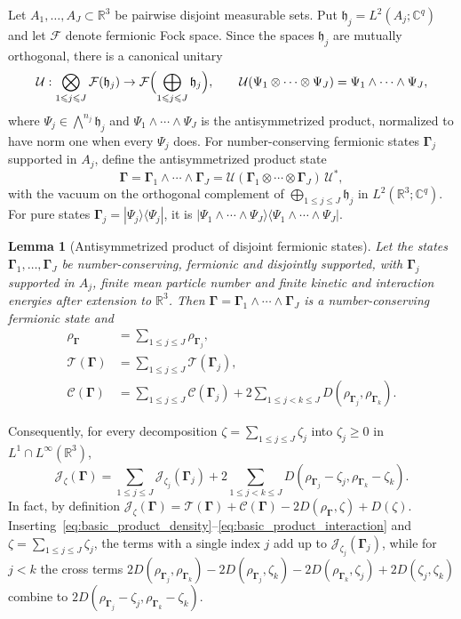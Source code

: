 \documentclass[final,reqno]{amsart}
\newtheorem{lemma}[theorem]{Lemma}
\theoremstyle{remark}
\theoremstyle{definition}
\renewcommand{\le}{\leqslant}
\renewcommand{\ge}{\geqslant}
\newcommand{\RR}{\mathbb{R}}
\newcommand{\CC}{\mathbb{C}}
\newcommand{\TC}{\mathcal{T}}
\newcommand{\Cc}{\mathcal{C}}
\newcommand{\Fock}{\mathcal{F}}
\newcommand{\vGamma}{{\bm{\Gamma}}}
\begin{document}
Let $A_1,\ldots,A_J\subset\RR^3$ be pairwise disjoint measurable sets. Put $\mathfrak h_j=L^2(A_j;\CC^q)$ and let $\Fock$ denote fermionic Fock space. Since the spaces $\mathfrak h_j$ are mutually orthogonal, there is a canonical unitary
\[
\mathcal U:\bigotimes_{1\le j\le J}\Fock(\mathfrak h_j)\to\Fock\Bigl(\bigoplus_{1\le j\le J}\mathfrak h_j\Bigr),
\qquad
\mathcal U(\Psi_1\otimes\cdots\otimes\Psi_J)=\Psi_1\wedge\cdots\wedge\Psi_J,
\]
where $\Psi_j\in\bigwedge^{n_j}\mathfrak h_j$ and $\Psi_1\wedge\cdots\wedge\Psi_J$ is the antisymmetrized product, normalized to have norm one when every $\Psi_j$ does. For number-conserving fermionic states $\vGamma_j$ supported in $A_j$, define the antisymmetrized product state
\[
\vGamma=\vGamma_1\wedge\cdots\wedge\vGamma_J=\mathcal U(\vGamma_1\otimes\cdots\otimes\vGamma_J)\,\mathcal U^*,
\]
with the vacuum on the orthogonal complement of $\bigoplus_{1\le j\le J}\mathfrak h_j$ in $L^2(\RR^3;\CC^q)$. For pure states $\vGamma_j=|\Psi_j\rangle\langle\Psi_j|$, it is $|\Psi_1\wedge\cdots\wedge\Psi_J\rangle\langle\Psi_1\wedge\cdots\wedge\Psi_J|$.

\begin{lemma}[Antisymmetrized product of disjoint fermionic states]\label{lem:basic_product}
Let the states $\vGamma_1,\ldots,\vGamma_J$ be number-conserving, fermionic and disjointly supported, with $\vGamma_j$ supported in $A_j$, finite mean particle number and finite kinetic and interaction energies after extension to $\RR^3$. Then $\vGamma=\vGamma_1\wedge\cdots\wedge\vGamma_J$ is a number-conserving fermionic state and
\begin{align}
\rho_{\vGamma}&=\sum_{1\le j\le J}\rho_{\vGamma_j},\label{eq:basic_product_density}\\
\TC(\vGamma)&=\sum_{1\le j\le J}\TC(\vGamma_j),\label{eq:basic_product_kinetic}\\
\Cc(\vGamma)&=\sum_{1\le j\le J}\Cc(\vGamma_j)+2\sum_{1\le j<k\le J}D(\rho_{\vGamma_j},\rho_{\vGamma_k}).
\label{eq:basic_product_interaction}
\end{align}
\end{lemma}
Consequently, for every decomposition $\zeta=\sum_{1\le j\le J}\zeta_j$ into $\zeta_j\ge0$ in $L^1\cap L^\infty(\RR^3)$,
\begin{equation}\label{eq:basic_product_J}
\mathcal J_\zeta(\vGamma)
=\sum_{1\le j\le J}\mathcal J_{\zeta_j}(\vGamma_j)
+2\sum_{1\le j<k\le J}D(\rho_{\vGamma_j}-\zeta_j,\rho_{\vGamma_k}-\zeta_k).
\end{equation}
In fact, by definition $\mathcal J_\zeta(\vGamma)=\TC(\vGamma)+\Cc(\vGamma)-2D(\rho_{\vGamma},\zeta)+D(\zeta)$. Inserting~\eqref{eq:basic_product_density}--\eqref{eq:basic_product_interaction} and $\zeta=\sum_{1\le j\le J}\zeta_j$, the terms with a single index $j$ add up to $\mathcal J_{\zeta_j}(\vGamma_j)$, while for $j<k$ the cross terms $2D(\rho_{\vGamma_j},\rho_{\vGamma_k})-2D(\rho_{\vGamma_j},\zeta_k)-2D(\rho_{\vGamma_k},\zeta_j)+2D(\zeta_j,\zeta_k)$ combine to $2D(\rho_{\vGamma_j}-\zeta_j,\rho_{\vGamma_k}-\zeta_k)$.
\end{document}
